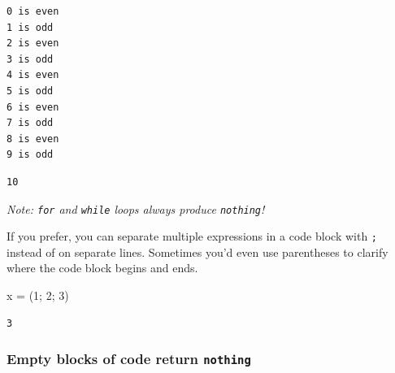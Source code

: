 \documentclass[
]{article}
\newenvironment{Shaded}{\begin{snugshade}}{\end{snugshade}}
\newcommand{\ControlFlowTok}[1]{\textcolor[rgb]{0.00,0.23,0.31}{\textbf{#1}}}
\newcommand{\FloatTok}[1]{\textcolor[rgb]{0.68,0.00,0.00}{#1}}
\newcommand{\FunctionTok}[1]{\textcolor[rgb]{0.28,0.35,0.67}{#1}}
\newcommand{\KeywordTok}[1]{\textcolor[rgb]{0.00,0.23,0.31}{\textbf{#1}}}
\newcommand{\NormalTok}[1]{\textcolor[rgb]{0.00,0.23,0.31}{#1}}
\newcommand{\OperatorTok}[1]{\textcolor[rgb]{0.37,0.37,0.37}{#1}}
\newcommand{\SpecialCharTok}[1]{\textcolor[rgb]{0.37,0.37,0.37}{#1}}
\newcommand{\StringTok}[1]{\textcolor[rgb]{0.13,0.47,0.30}{#1}}
\begin{document}
\begin{Shaded}
\end{Shaded}

\begin{verbatim}
0 is even
1 is odd
2 is even
3 is odd
4 is even
5 is odd
6 is even
7 is odd
8 is even
9 is odd
\end{verbatim}

\begin{verbatim}
10
\end{verbatim}

\emph{Note: \texttt{for} and \texttt{while} loops always produce
\texttt{nothing}!}

If you prefer, you can separate multiple expressions in a code block
with \texttt{;} instead of on separate lines. Sometimes you'd even use
parentheses to clarify where the code block begins and ends.

\begin{Shaded}
\begin{Highlighting}[]
\NormalTok{x }\OperatorTok{=}\NormalTok{ (}\FloatTok{1}\NormalTok{; }\FloatTok{2}\NormalTok{; }\FloatTok{3}\NormalTok{)}
\end{Highlighting}
\end{Shaded}

\begin{verbatim}
3
\end{verbatim}

\subsubsection{\texorpdfstring{Empty blocks of code return
\texttt{nothing}}{Empty blocks of code return nothing}}\label{empty-blocks-of-code-return-nothing}
\end{document}
